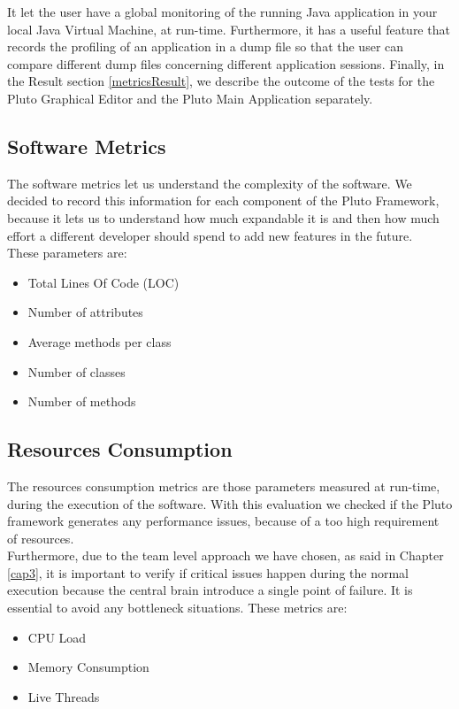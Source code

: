 It let the user have a global monitoring of the running Java application in your local Java Virtual Machine, at run-time. Furthermore, it has a useful feature that records the profiling of an application in a dump file so that the user can compare different dump files concerning different application sessions.
Finally, in the Result section \ref{metricsResult}, we describe the outcome of the tests for the Pluto Graphical Editor and the Pluto Main Application separately.

\subsection{Software Metrics}

The software metrics let us understand the complexity of the software.
We decided to record this information for each component of the Pluto Framework, because it lets us to understand how much expandable it is and then how much effort a different developer should spend to add new features in the future.
\\

These parameters are:

\begin{itemize}
\item Total Lines Of Code (LOC)
\item Number of attributes
\item Average methods per class
\item Number of classes
\item Number of methods
\end{itemize}

\subsection{Resources Consumption}

The resources consumption metrics are those parameters measured at run-time, during the execution of the software.
With this evaluation we checked if the Pluto framework generates any performance issues, because of a too high requirement of resources. 
\\
Furthermore, due to the team level approach we have chosen, as said in Chapter \ref{cap3}, it is important to verify if critical issues happen during the normal execution because the central brain introduce a single point of failure. It is essential to avoid any bottleneck situations.
These metrics are:

\begin{itemize}
\item CPU Load
\item Memory Consumption
\item Live Threads
\end{itemize}

